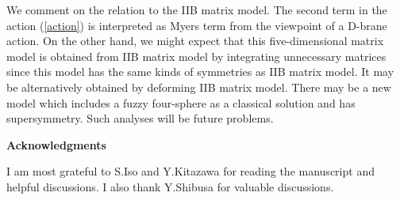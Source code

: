 \documentclass[a4paper,11pt]{article}
\begin{document}
We comment on the relation to the IIB matrix model. 
The second term in the action (\ref{action}) 
is interpreted as Myers term from the viewpoint of 
a D-brane action. 
On the other hand, 
we might expect that this five-dimensional matrix model 
is obtained from IIB matrix model 
by integrating unnecessary matrices 
since this model has the same kinds of symmetries as 
IIB matrix model. 
It may be alternatively obtained by deforming IIB matrix model. 
There may be 
a new model which includes a fuzzy four-sphere as a classical solution 
and has supersymmetry. 
Such analyses will be future problems. 

\vspace{1cm}
\begin{center}
{\bf Acknowledgments}
\end{center}
\hspace{0.4cm}
I am most grateful to S.Iso and Y.Kitazawa 
for reading the manuscript and helpful discussions. 
I also thank Y.Shibusa for valuable discussions. 


\renewcommand{\theequation}{\Alph{section}.\arabic{equation}}
\appendix
\end{document}

